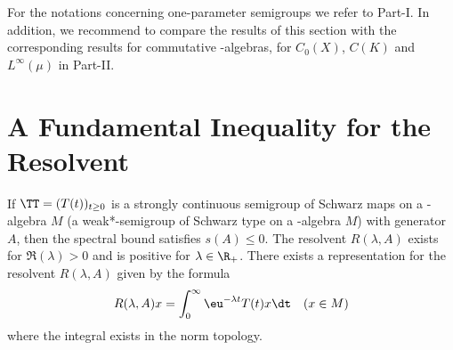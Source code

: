 For the notations concerning one-parameter semigroups we refer to Part-I.
In addition, we recommend to compare the results of this section with the corresponding results for commutative \CA-algebras, \ie for $ C_{0}(X) $, $ C(K) $ and $ L^\infty(\mu) $ in Part-II.
\section{A Fundamental Inequality for the Resolvent}\label{sec:d1-2}
If\/ $ \TT = (T(t))_{t \geq 0} $ is a strongly continuous semigroup of Schwarz maps on a \CA-algebra $ M $ (\resp a weak*-semigroup of Schwarz type on a \WA-algebra $ M $) with generator $ A $, then the spectral bound satisfies $ s(A) \leq 0 $.
The resolvent $ R(\lambda, A) $ exists for $ \Re(\lambda) > 0 $ and is positive for $ \lambda \in \R_{+} $.
There exists a representation for the resolvent $ R(\lambda,A) $ given by the formula
\[
 	R(\lambda,A)x = \int_{0}^\infty \eu^{-\lambda t} T(t)x  \dt  \quad (x \in M)
\]
where the integral exists in the norm topology.

